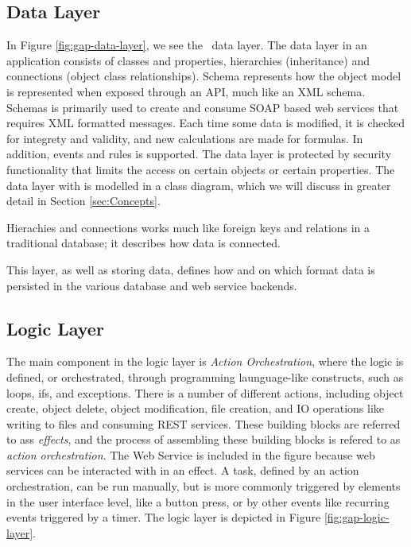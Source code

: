 \subsection{Data Layer}
\label{sub:Data Layer}
In Figure \ref{fig:gap-data-layer}, we see the \gap~data layer. The data layer in an application consists of classes and properties, hierarchies (inheritance) and connections (object class relationships). Schema represents how the object model is represented when exposed through an API, much like an XML schema. Schemas is primarily used to create and consume SOAP based web services that requires XML formatted messages. Each time some data is modified, it is checked for integrety and validity, and new calculations are made for formulas. In addition, events and rules is supported. The data layer is protected by security functionality that limits the access on certain objects or certain properties. The data layer with is modelled in a class diagram, which we will discuss in greater detail in Section \ref{sec:Concepts}.

Hierachies and connections works much like foreign keys and relations in a traditional database; it describes how data is connected.

This layer, as well as storing data, defines how and on which format data is persisted in the various database and web service backends.

\subsection{Logic Layer}
\label{sub:Logic Layer}
The main component in the logic layer is \textit{Action Orchestration}, where the logic is defined, or orchestrated, through programming launguage-like constructs, such as loops, ifs, and exceptions. There is a number of different actions, including object create, object delete, object modification, file creation, and IO operations like writing to files and consuming REST services. These building blocks are referred to ass \textit{effects}, and the process of assembling these building blocks is refered to as \textit{action orchestration}. The Web Service is included in the figure because web services can be interacted with in an effect. A task, defined by an action orchestration, can be run manually, but is more commonly triggered by elements in the user interface level, like a button press, or by other events like recurring events triggered by a timer. The logic layer is depicted in Figure \ref{fig:gap-logic-layer}.



